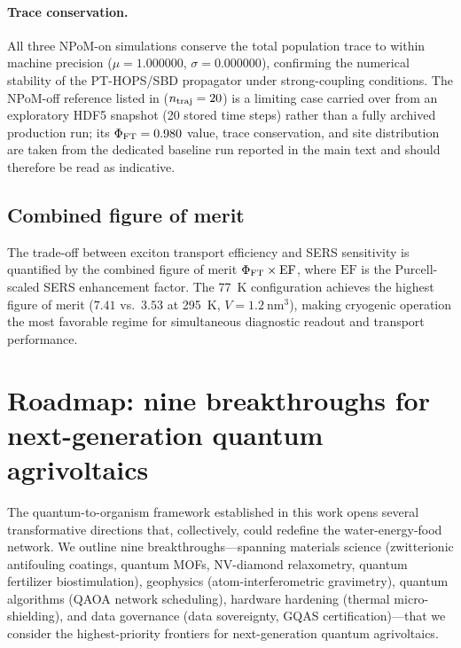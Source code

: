 \documentclass[11pt,a4paper]{article}
\begin{document}
\paragraph{Trace conservation.}
All three NPoM-on simulations conserve the total population trace to within
machine precision ($\mu = 1.000000$, $\sigma = 0.000000$), confirming the
numerical stability of the PT-HOPS/SBD propagator under strong-coupling
conditions.
The NPoM-off reference listed in 
($n_{\rm traj} = 20$) is a limiting case carried over from an exploratory
HDF5 snapshot (20 stored time steps) rather than a fully archived production
run; its $\Phi_{\rm FT} = 0.980$ value, trace conservation, and site
distribution are taken from the dedicated baseline run reported in the main
text and should therefore be read as indicative.

\subsection{Combined figure of merit}

The trade-off between exciton transport efficiency and SERS sensitivity is
quantified by the combined figure of merit $\Phi_{\rm FT} \times \mathrm{EF}$,
where $\mathrm{EF}$ is the Purcell-scaled SERS enhancement factor.
The \qty{77}{\kelvin} configuration achieves the highest figure of merit
($7.41$ vs.~$3.53$ at \qty{295}{\kelvin}, $V = \qty{1.2}{\nm\cubed}$),
making cryogenic operation the most favorable regime for simultaneous
diagnostic readout and transport performance.



\section{Roadmap: nine breakthroughs for next-generation quantum agrivoltaics}
\label{SI-sec:roadmap}

The quantum-to-organism framework established in this work opens several
transformative directions that, collectively, could redefine the
water-energy-food network. We outline nine breakthroughs---spanning materials
science (zwitterionic antifouling coatings, quantum MOFs, NV-diamond relaxometry,
quantum fertilizer biostimulation), geophysics (atom-interferometric gravimetry),
quantum algorithms (QAOA network scheduling), hardware hardening (thermal
micro-shielding), and data governance (data sovereignty, GQAS certification)---that
we consider the highest-priority frontiers for next-generation quantum agrivoltaics.
\end{document}
